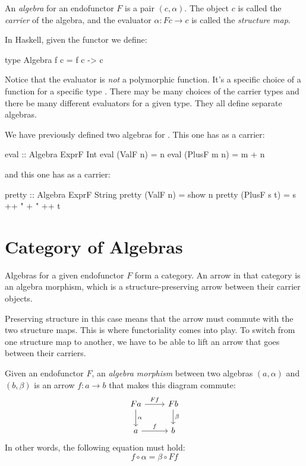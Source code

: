 \documentclass[DaoFP]{subfiles}
\begin{document}
An \emph{algebra} for an endofunctor $F$ is a pair $(c, \alpha)$. The object $c$ is called the \emph{carrier} of the algebra, and the evaluator $\alpha \colon F c \to c$ is called the \emph{structure map}.

In Haskell, given the functor  we define:
\begin{haskell}
type Algebra f c = f c -> c
\end{haskell}

Notice that the evaluator is \emph{not} a polymorphic function. It's a specific choice of a function for a specific type . There may be many choices of the carrier types and there be many different evaluators for a given type. They all define separate algebras.

We have previously defined two algebras for . This one has  as a carrier:
\begin{haskell}
eval :: Algebra ExprF Int
eval (ValF n)   = n
eval (PlusF m n) = m + n
\end{haskell}
and this one has  as a carrier:
\begin{haskell}
pretty :: Algebra ExprF String
pretty (ValF n)   = show n
pretty (PlusF s t) = s ++ " + " ++ t
\end{haskell}

\section{Category of Algebras}

Algebras for a given endofunctor $F$ form a category. An arrow in that category is an algebra morphism, which is a structure-preserving arrow between their carrier objects. 

Preserving structure in this case means that the arrow must commute with the two structure maps. This is where functoriality comes into play. To switch from one structure map to another, we have to be able to lift an arrow that goes between their carriers. 

Given an endofunctor $F$, an \emph{algebra morphism} between two algebras $(a, \alpha)$ and $(b, \beta)$ is an arrow $f \colon a \to b$ that makes this diagram commute:
\[
 \begin{tikzcd}
 F a 
 \arrow[r, "F f"]
 \arrow[d, "\alpha"]
 & F b
\arrow[d, "\beta"]
 \\
 a
 \arrow[r, "f"]
 & b
  \end{tikzcd}
\]
In other words, the following equation must hold:
\[f \circ \alpha = \beta \circ F f \]
\end{document}
